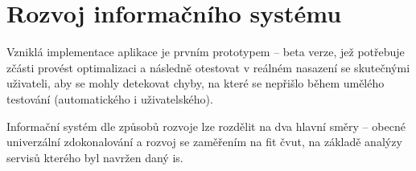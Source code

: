 \chapter{Rozvoj informačního systému}

Vzniklá implementace aplikace je prvním prototypem -- beta verze, jež potřebuje zčásti provést optimalizaci a následně otestovat v reálném nasazení se skutečnými uživateli, aby se mohly detekovat chyby, na které se nepřišlo během umělého testování (automatického i uživatelského).

Informační systém dle způsobů rozvoje lze rozdělit na dva hlavní směry -- obecné univerzální zdokonalování a rozvoj se zaměřením na \gls{fit} \gls{čvut}, na základě analýzy servisů kterého byl navržen daný \gls{is}. 


